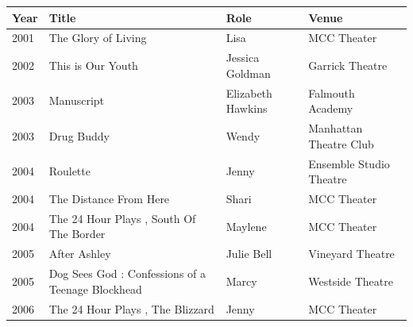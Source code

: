 \documentclass{article}
\begin{document}
\begin{tabular}{llll}
\toprule
Year & Title & Role & Venue \\
\midrule
2001 & The Glory of Living & Lisa & MCC Theater \\
2002 & This is Our Youth & Jessica Goldman & Garrick Theatre \\
2003 & Manuscript & Elizabeth Hawkins & Falmouth Academy \\
2003 & Drug Buddy & Wendy & Manhattan Theatre Club \\
2004 & Roulette & Jenny & Ensemble Studio Theatre \\
2004 & The Distance From Here & Shari & MCC Theater \\
2004 & The 24 Hour Plays , South Of The Border & Maylene & MCC Theater \\
2005 & After Ashley & Julie Bell & Vineyard Theatre \\
2005 & Dog Sees God : Confessions of a Teenage Blockhead & Marcy & Westside Theatre \\
2006 & The 24 Hour Plays , The Blizzard & Jenny & MCC Theater \\
\bottomrule
\end{tabular}
\end{document}
